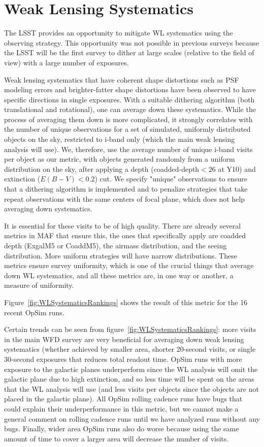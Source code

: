 \section{Weak Lensing Systematics}

The LSST provides an opportunity to mitigate WL systematics using the observing strategy. This opportunity was not possible in previous surveys because the LSST will be the first survey to dither at large scales (relative to the field of view) with a large number of exposures.

Weak lensing systematics that have coherent shape distortions such as PSF modeling errors and brighter-fatter shape distortions have been observed to have specific directions in single exposures. With a suitable dithering algorithm (both translational and rotational), one can average down these systematics. While the process of averaging them down is more complicated, it strongly correlates with the number of unique observations for a set of simulated, uniformly distributed objects on the sky, restricted to i-band only (which the main weak lensing analysis will use). We, therefore, use the average number of unique i-band visits per object as our metric, with objects generated randomly from a uniform distribution on the sky, after applying a depth (coadded-depth$<26$ at Y10) and extinction ($E(B-V)<0.2$) cut. We specify "unique" observations to ensure that a dithering algorithm is implemented and to penalize strategies that take repeat observations with the same centers of focal plane, which does not help averaging down systematics.

It is essential for these visits to be of high quality. There are already several metrics in MAF that ensure this, the ones that specifically apply are coadded depth (ExgalM5 or CoaddM5), the airmass distribution, and the seeing distribution. More uniform strategies will have narrow distributions. These metrics ensure survey uniformity, which is one of the crucial things that average down WL systematics, and all these metrics are, in one way or another, a measure of uniformity.

Figure~\ref{fig:WLSystematicsRankings} shows the result of this metric for the 16 recent OpSim runs. 

Certain trends can be seen from  figure~\ref{fig:WLSystematicsRankings}: more visits in the main WFD survey are very beneficial for averaging down weak lensing systematics (whether achieved by smaller area, shorter 20-second visits, or single 30-second exposures that reduces total readout time. OpSim runs with more exposure to the galactic planes underperform since the WL analysis will omit the galactic plane due to high extinction, and so less time will be spent on the areas that the WL analysis will use (and less visits per objects since the objects are not placed in the galactic plane). All OpSim rolling cadence runs have bugs that could explain their underperformance in this metric, but we cannot make a general comment on rolling cadence runs until we have analyzed runs without any bugs. Finally, wider area OpSim runs also do worse because using the same amount of time to cover a larger area will decrease the number of visits.

